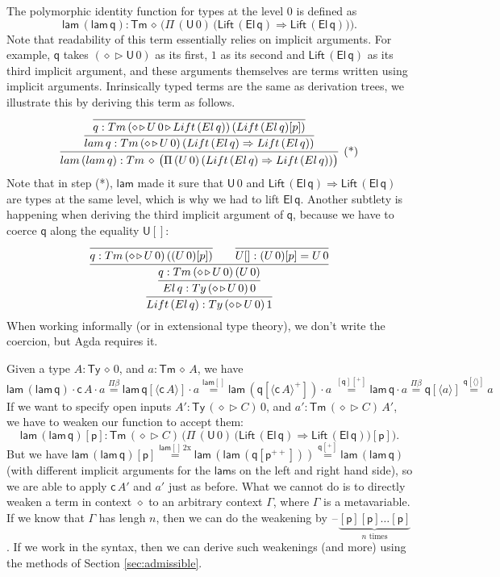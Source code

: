 \documentclass[a4paper,UKenglish,cleveref, autoref, thm-restate]{lipics-v2021}
\newcommand{\Ra}{\Rightarrow}
\newcommand{\Ty}{\mathsf{Ty}}
\newcommand{\Tm}{\mathsf{Tm}}
\newcommand{\p}{\mathsf{p}}
\newcommand{\q}{\mathsf{q}}
\newcommand{\ext}{\mathop{\triangleright}}
\newcommand{\lam}{\mathsf{lam}}
\newcommand{\U}{\mathsf{U}}
\newcommand{\El}{\mathsf{El}}
\newcommand{\cd}{\mathsf{c}}
\newcommand{\blank}{\mathord{\hspace{1pt}\text{--}\hspace{1pt}}} %
\newcommand{\Lift}{\mathsf{Lift}}
\begin{document}
The polymorphic identity function for types at the level 0 is defined
as
\[
\lam\,(\lam\,\q) : \Tm\,\diamond\,\Big(\Pi\,(\U\,0)\,\big(\Lift\,(\El\,\q)\Ra\Lift\,(\El\,\q)\big)\Big).
\]
Note that readability of this term essentially relies on implicit
arguments. For example, $\q$ takes $(\diamond\ext\U\,0)$ as its first,
$1$ as its second and $\Lift\,(\El\,\q)$ as its third implicit
argument, and these arguments themselves are terms written using
implicit arguments. Inrinsically typed terms are the same as
derivation trees, we illustrate this by deriving this term as follows.
\[
\infer[\text{(*)}]{\lam\,(\lam\,\q) : \Tm\,\diamond\,\big(\Pi\,(\U\,0)\,(\Lift\,(\El\,\q)\Ra\Lift\,(\El\,\q))\big)}{\infer{\lam\,\q : \Tm\,(\diamond\ext\U\,0)\,(\Lift\,(\El\,\q)\Ra\Lift\,(\El\,\q))}{\infer{\q : \Tm\,(\diamond\ext\U\,0\ext\Lift\,(\El\,\q))\,(\Lift\,(\El\,\q)[\p])}{}}}
\]
Note that in step (*), $\lam$ made it sure that $\U\,0$ and
$\Lift\,(\El\,\q)\Ra\Lift\,(\El\,\q)$ are types at the same level,
which is why we had to lift $\El\,\q$. Another subtlety is
happening when deriving the third implicit argument of $\q$, because we have
to coerce $\q$ along the equality $\U[]$:
\[
\infer{\Lift\,(\El\,\q) : \Ty\,(\diamond\ext\U\,0)\,1}{\infer{\El\,\q : \Ty\,(\diamond\ext\U\,0)\,0}{\infer{\q : \Tm\,(\diamond\ext\U\,0)\,(\U\,0)}{\infer{\q : \Tm\,(\diamond\ext\U\,0)\,((\U\,0)[\p])}{} && \infer{\U[] : (\U\,0)[\p] = \U\,0}{}}}}
\]
When working informally (or in extensional type theory), we don't
write the coercion, but Agda requires it.

Given a type $A:\Ty\,\diamond\,0$, and $a : \Tm\,\diamond\,A$, we have
\[
\lam\,(\lam\,\q)\cdot\cd\,A\cdot a \overset{\Pi\beta}{=}
\lam\,\q[\langle\cd\,A\rangle]\cdot a \overset{\lam[]}{=}
\lam\,(\q[\langle\cd\,A\rangle^+])\cdot a\, \overset{[\q][^+]}{=}
\lam\,\q\cdot a \overset{\Pi\beta}{=}
\q[\langle a\rangle] \overset{\q[\langle\rangle]}{=}
a
\]
If we want to specify open inputs $A':\Ty\,(\diamond\ext C)\,0$, and
$a' : \Tm\,(\diamond\ext C)\,A'$, we have to weaken our function to
accept them:
\[
\lam\,(\lam\,\q)[\p] : \Tm\,(\diamond\ext C)\,\Big(\Pi\,(\U\,0)\,\big(\Lift\,(\El\,\q)\Ra\Lift\,(\El\,\q)\big)[\p]\Big).
\]
But we have
$
\lam\,(\lam\,\q)[\p] \overset{\lam[]\,2\text{x}}{=} \lam\,(\lam\,(\q[\p^{++}])) \overset{\q[^+]}{=} \lam\,(\lam\,\q)
$
(with different implicit arguments for the $\lam$s on the left and right hand side), so we are able to apply $\cd\,A'$
and $a'$ just as before. What we cannot do is to directly weaken a
term in context $\diamond$ to an arbitrary context $\Gamma$, where
$\Gamma$ is a metavariable. If we know that $\Gamma$ has lengh $n$,
then we can do the weakening by
$\blank\underbrace{[\p][\p]\dots[\p]}_{\text{$n$ times}}$. If we work
in the syntax, then we can derive such weakenings (and more) using the
methods of Section \ref{sec:admissible}.
\end{document}
